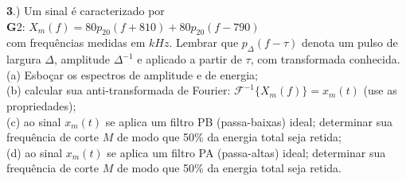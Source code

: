 \documentclass[10pt, a4paper]{article}
\begin{document}
\vspace{\baselineskip}
{\textbf 3.)} Um sinal é caracterizado por\\
{\textbf G2:} $ X_{m}(f) = 80p_{20}(f + 810) + 80p_{20}(f - 790) $\\
com frequências medidas em $kHz$. Lembrar que $p_{\Delta}(f - \tau)$ denota um pulso de largura $\Delta$, amplitude $\Delta^{-1}$ e aplicado a partir de $\tau$, com transformada conhecida.\\
(a) Esboçar os espectros de amplitude e de energia;\\
(b) calcular sua anti-transformada de Fourier: $\mathcal{F}^{-1} \{X_{m}(f)\} = x_{m}(t)$ (use as propriedades);\\
(c) ao sinal $x_{m}(t)$ se aplica um filtro PB (passa-baixas) ideal; determinar sua frequência de corte $M$ de modo que 50\% da energia total seja retida;\\
(d) ao sinal $x_{m}(t)$ se aplica um filtro PA (passa-altas) ideal; determinar sua frequência de corte $M$ de modo que 50\% da energia total seja retida.
\end{document}
